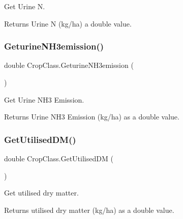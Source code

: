 Get Urine N. 

\begin{DoxyReturn}{Returns}
Urine N (kg/ha) a double value. 
\end{DoxyReturn}
\mbox{\label{class_crop_class_a5dcc42d890c15f6dc26d88c19e9a362c}} 
\subsubsection{\texorpdfstring{GeturineNH3emission()}{GeturineNH3emission()}}
{\footnotesize\ttfamily double Crop\+Class.\+Geturine\+N\+H3emission (\begin{DoxyParamCaption}{ }\end{DoxyParamCaption})\hspace{0.3cm}{\ttfamily [inline]}}



Get Urine N\+H3 Emission. 

\begin{DoxyReturn}{Returns}
Urine N\+H3 Emission (kg/ha) as a double value. 
\end{DoxyReturn}
\mbox{\label{class_crop_class_a4c6cf05c8de9e2db60ec32498816d444}} 
\subsubsection{\texorpdfstring{GetUtilisedDM()}{GetUtilisedDM()}}
{\footnotesize\ttfamily double Crop\+Class.\+Get\+Utilised\+DM (\begin{DoxyParamCaption}{ }\end{DoxyParamCaption})\hspace{0.3cm}{\ttfamily [inline]}}



Get utilised dry matter. 

\begin{DoxyReturn}{Returns}
utilised dry matter (kg/ha) as a double value. 
\end{DoxyReturn}
\mbox{\label{class_crop_class_ab6c8a1cbfc2dd57c34344081cc6c9ed4}} 
